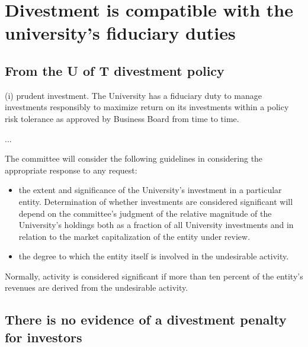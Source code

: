 


\section {Divestment is compatible with the university's fiduciary duties}



\subsection {From the U of T divestment policy}
(i) prudent investment. The University has a fiduciary duty to manage investments responsibly to maximize return on its investments within a policy risk tolerance as approved by Business Board from time to time.

...

The committee will consider the following guidelines in considering the appropriate response to any request:
\begin{itemize}
  \item the extent and significance of the University's investment in a particular entity. Determination of whether investments are considered significant will depend on the committee’s judgment of the relative magnitude of the University’s holdings both as a fraction of all University investments and in relation to the market capitalization of the entity under review.
  \item the degree to which the entity itself is involved in the undesirable activity.
\end{itemize}
Normally, activity is considered significant if more than ten percent of the entity's revenues are derived from the undesirable activity.

\subsection {There is no evidence of a divestment penalty for investors}

